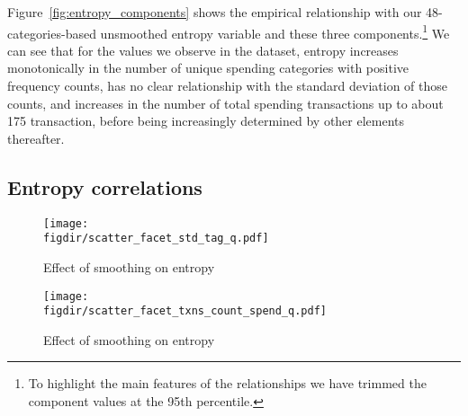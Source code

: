Figure~\ref{fig:entropy_components} shows the empirical relationship with our
48-categories-based unsmoothed entropy variable and these three
components.\footnote{To highlight the main features of the relationships we
have trimmed the component values at the 95th percentile.} We can see that for
the values we observe in the dataset, entropy increases monotonically in the
number of unique spending categories with positive frequency counts, has no
clear relationship with the standard deviation of those counts, and increases
in the number of total spending transactions up to about 175 transaction,
before being increasingly determined by other elements thereafter.


\subsection{Entropy correlations}%
\label{sub:entropy_correlations}

\begin{figure}[ht]
    \centering 
    \caption{Effect of smoothing on entropy}
    \label{fig:scatter_facets_std_tag_q}
    \texttt{[image: \\figdir/scatter\_facet\_std\_tag\_q.pdf]}
\end{figure}

\begin{figure}[ht]
    \centering 
    \caption{Effect of smoothing on entropy}
    \label{fig:scatter_facets_txns_count_spend_q}
    \texttt{[image: \\figdir/scatter\_facet\_txns\_count\_spend\_q.pdf]}
\end{figure}\newpage

